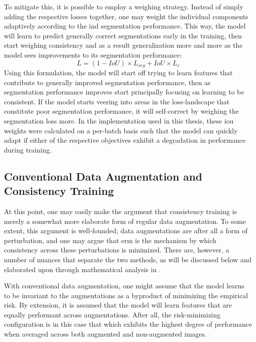 To mitigate this, it is possible to employ a weighing strategy. Instead of simply adding the respective losses together, one may weight the individual components adaptively according to the \gls{ind} segmentation performance. This way, the model will learn to predict generally correct segmentations early in the training, then start weighing consistency and as a result generalization more and more as the model sees improvements to its segmentation performance:
    \begin{equation}
        L = (1-IoU)\times L_{seg} + IoU \times L_c
    \end{equation}
Using this formulation, the model will start off trying to learn features that contribute to generally improved segmentation performance, then as segmentation performance improves start principally focusing on learning to be consistent. If the model starts veering into areas in the loss-landscape that constitute poor segmentation performance, it will self-correct by weighing the segmentation loss more. In the implementation used in this thesis, these \gls{iou} weights were calculated on a per-batch basis such that the model can quickly adapt if either of the respective objectives exhibit a degradation in performance during training. 

\subsection{Conventional Data Augmentation and Consistency Training}\label{cons_vs_aug}
    At this point, one may easily make the argument that consistency training is merely a somewhat more elaborate form of regular data augmentation. To some extent, this argument is well-founded; data augmentations are after all a form of perturbation, and one may argue that \gls{erm} is the mechanism by which consistency across these perturbations is minimized. There are, however, a number of nuances that separate the two methods, as will be discussed below and elaborated upon through mathematical analysis in . 
    
    With conventional data augmentation, one might assume that the model learns to be invariant to the augmentations as a byproduct of minimizing the empirical risk. By extension, it is assumed that the model will learn features that are equally performant across augmentations. After all, the risk-minimizing configuration is in this case that which exhibits the highest degree of performance when averaged across both augmented and non-augmented images. 
    
